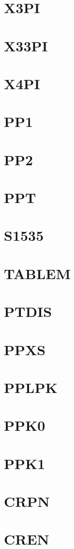 \documentclass[14pt,UTF8]{ctexbook}
\begin{document}
\section{X3PI}
\section{X33PI}
\section{X4PI}
\section{PP1}
\section{PP2}
\section{PPT}
\section{S1535}
\section{TABLEM}
\section{PTDIS}
\section{PPXS}
\section{PPLPK}
\section{PPK0}
\section{PPK1}
\section{CRPN}
\section{CREN}
\end{document}
